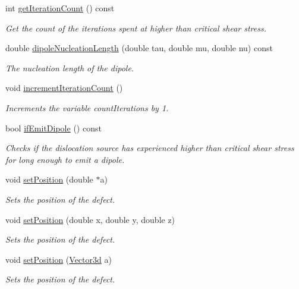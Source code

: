 \begin{DoxyCompactItemize}
int \hyperlink{classDislocationSource_a445cd1bf2354e388e66c588736ed6876}{get\-Iteration\-Count} () const 
\begin{DoxyCompactList}\small\item\em Get the count of the iterations spent at higher than critical shear stress. \end{DoxyCompactList}\item 
double \hyperlink{classDislocationSource_aeaea81924e840cc99ec1844dd72ab807}{dipole\-Nucleation\-Length} (double tau, double mu, double nu) const 
\begin{DoxyCompactList}\small\item\em The nucleation length of the dipole. \end{DoxyCompactList}\item 
void \hyperlink{classDislocationSource_a7934f1747dbde5dfe0ca7c2a6bac39ce}{increment\-Iteration\-Count} ()
\begin{DoxyCompactList}\small\item\em Increments the variable count\-Iterations by 1. \end{DoxyCompactList}\item 
bool \hyperlink{classDislocationSource_afcc06ad0c0152f15cea25317bebd13cb}{if\-Emit\-Dipole} () const 
\begin{DoxyCompactList}\small\item\em Checks if the dislocation source has experienced higher than critical shear stress for long enough to emit a dipole. \end{DoxyCompactList}\item 
void \hyperlink{classDefect_a2d233d13a8a93f6fba463a1fbc1c6c9f}{set\-Position} (double $\ast$a)
\begin{DoxyCompactList}\small\item\em Sets the position of the defect. \end{DoxyCompactList}\item 
void \hyperlink{classDefect_ad1a6acd8399d2ecabb7ce2b77623bbec}{set\-Position} (double x, double y, double z)
\begin{DoxyCompactList}\small\item\em Sets the position of the defect. \end{DoxyCompactList}\item 
void \hyperlink{classDefect_a36ffa9b4b01d38ed8a95ca2c78973cc4}{set\-Position} (\hyperlink{classVector3d}{Vector3d} a)
\begin{DoxyCompactList}\small\item\em Sets the position of the defect. \end{DoxyCompactList}\item 

\end{DoxyCompactItemize}
